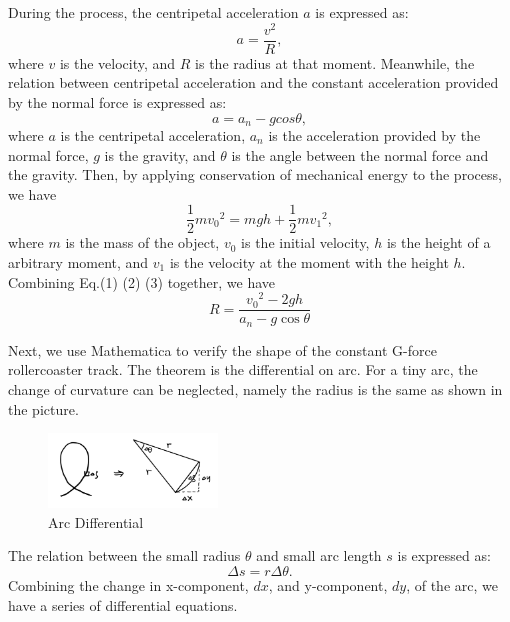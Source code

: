 \documentclass{article}
\begin{document}
During the process, the centripetal acceleration $a$ is expressed as:
    \begin{equation}
    a=\frac{v^2}{R},
    \end{equation}
where $v$ is the velocity, and $R$ is the radius at that moment. Meanwhile, the relation between centripetal acceleration and the constant acceleration provided by the normal force is expressed as:
    \begin{equation}
    a=a_{n}-g cos{\theta},
    \end{equation}
where $a$ is the centripetal acceleration, $a_n$ is the acceleration provided by the normal force, $g$ is the gravity, and $\theta$ is the angle between the normal force and the gravity.
Then, by applying conservation of mechanical energy to the process, we have
    \begin{equation}
    \frac{1}{2} m {v_{0}}^2=m g h + \frac{1}{2} m {v_{1}}^2,
    \end{equation}
where $m$ is the mass of the object, $v_0$ is the initial velocity, $h$ is the height of a arbitrary moment, and $v_1$ is the velocity at the moment with the height $h$. Combining Eq.(1) (2) (3) together, we have
    \begin{equation}
    R=\frac{{v_0}^2-2gh}{a_n-g \cos{\theta}}
    \end{equation}

Next, we use Mathematica to verify the shape of the constant G-force rollercoaster track. The theorem is the differential on arc. For a tiny arc, the change of curvature can be neglected, namely the radius is the same as shown in the picture.

\begin{figure}[htbp]
    \centering
    \includegraphics[width=0.4\textwidth]{1.png}
    \caption{Arc Differential}
    \end{figure}  

The relation between the small radius $\theta$ and small arc length $s$ is expressed as:
    \begin{equation}
    \Delta s=r\Delta \theta.
    \end{equation}
Combining the change in x-component, $dx$, and y-component, $dy$, of the arc, we have a series of differential equations.
\end{document}
